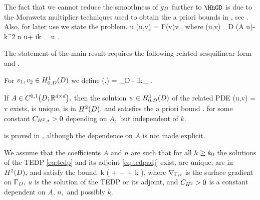 The fact that we cannot reduce the smoothness of $g_{D}$ further to $\HhGD$ is due to the Morawetz multiplier techniques used to obtain the a priori bounds in \cite{GrPeSp:18}, see \cite[(iii), p. 2874]{GrPeSp:18}.
\ere
{}
Also, for later use we state the  problem.
\beq\label{eq:tedpadj}
 u \in \HozDD\quad \tst\quad \aadj(u,v) = F(v)\quad \tfa v \in \HozDD,
\eeq
where
\beqs
\aadj(u,v) \de \int_D \mleft(A \grad u\mright)\cdot \grad \vb - k^2 n u\vb + ik \int_{\GI} \trGI u \trGI \vb.
\eeqs

The statement of the main result requires the following related sesquilinear form and .

For $\vo, \vt \in \HozDD$ we define
\beqs
\api(\vo,\vt) = \int_D  - ik\int_{\GI} \vo\vtbar.
\eeqs
\ede

\label{lem:relatedwp}
If $A \in \CzoDRRdtd,$ then the solution $\psi \in \HozDD$ of the related PDE
\beq\label{eq:relpde}
\api(u,v) = \quad \tfa\quad v \in \HozDD
\eeq
exists, is unique, is in $\HtD,$ and satisfies the a priori bound
\beqs
\NHtD{\psi} \lesssim \CHtell {}.
\eeqs
for some constant $C_{H^{2},\star} > 0$ depending on $A,$ but independent of $k.$
\ele

 is proved in \cite{ChNiTo:18}, although the dependence on $A$ is not made explicit.
\ere


\label{ass:bound}
We assume that the coefficients $A$ and $n$ are such that for all $k \geq k_0$ the solutions of the TEDP \eqref{eq:tedp} and its adjoint \eqref{eq:tedpadj} exist, are unique, are in $\HtD,$ and satisfy the bound
\beq\label{eq:hhbound}
 \lesssim \CHthh \,k \mleft( +  + \NLtGD{\gradGD \gD} + k \NLtGD{\gD}\mright),
\eeq
where $\nabla_{\Gamma_{D}}$ is the surface gradient on $\Gamma_{D},$ $u$ is the solution of the TEDP or its adjoint, and $C_{H^2} >0$ is a constant dependent on $A$, $n,$ and possibly $k.$
 \eas

